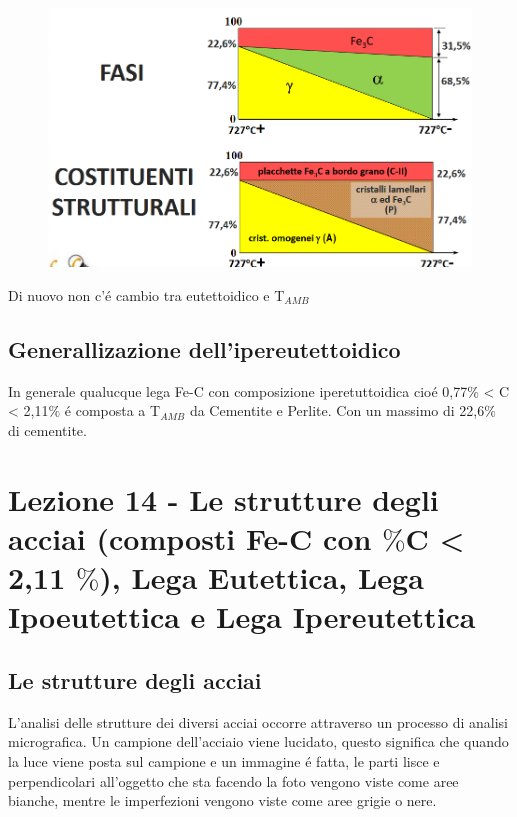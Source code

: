 \documentclass{article}
\begin{document}
{            \begin{figure}[h!]
                \centering
                \includegraphics[width=.8\linewidth]{L13 - Fe-C 2,11C Diagrammi di fase e costituenti prima e dopo l'eutettoidico.png}
            \end{figure}
        \newpage
            Di nuovo non c'\'e cambio tra eutettoidico e T$_{AMB}$\\
        \newpage
        \subsection{Generallizazione dell'ipereutettoidico}
            In generale qualucque lega Fe-C con composizione iperetuttoidica cio\'e 0,77$\%$ < C < 2,11$\%$ \'e composta a T$_{AMB}$ da Cementite e Perlite. Con un massimo di 22,6$\%$ di cementite.   
    
    \newpage
    \section{Lezione 14 - Le strutture degli acciai (composti Fe-C con $\%$C < 2,11 $\%$), Lega Eutettica, Lega Ipoeutettica e Lega Ipereutettica}
        \subsection{Le strutture degli acciai}
            L'analisi delle strutture dei diversi acciai occorre attraverso un processo di analisi micrografica. Un campione dell'acciaio viene lucidato, questo significa che quando la luce viene posta sul campione e un immagine \'e fatta, le parti lisce e perpendicolari all'oggetto che sta facendo la foto vengono viste come aree bianche, mentre le imperfezioni vengono viste come aree grigie o nere.\\
}
\end{document}
